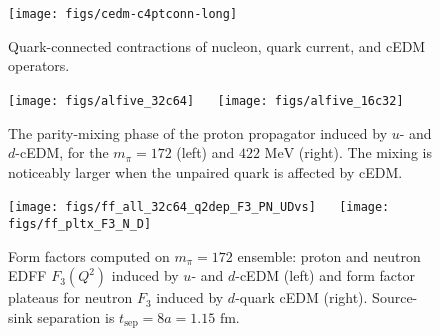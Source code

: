 \documentclass{PoS}
\begin{document}
\begin{figure}[t]
\centering
\texttt{[image: figs/cedm-c4ptconn-long]}
\caption{Quark-connected contractions of nucleon, quark current, and cEDM operators. 
  \label{fig:cedm_contract}}
\end{figure}


\begin{figure}[t]
\centering
\vspace{-.2cm}
\texttt{[image: figs/alfive\_32c64]}~
\hspace{.05\textwidth}~
\texttt{[image: figs/alfive\_16c32]}\\
\vspace{-.4cm}
\caption{The parity-mixing phase of the proton propagator induced by $u$- and $d$-cEDM, for the
  $m_\pi=172$ (left) and $422\text{ MeV}$ (right). 
  The mixing is noticeably larger when the unpaired quark is affected by cEDM.
  \label{fig:alfive}}
\end{figure}

\begin{figure}[t]
\centering
\vspace{-.2cm}
\texttt{[image: figs/ff\_all\_32c64\_q2dep\_F3\_PN\_UDvs]}~
\hspace{.05\textwidth}~
\texttt{[image: figs/ff\_pltx\_F3\_N\_D]}\\
\vspace{-.4cm}
\caption{Form factors computed on $m_\pi=172$ ensemble: proton and neutron EDFF 
  $F_3(Q^2)$ induced by $u$-  and $d$-cEDM (left)
  and form factor plateaus for neutron $F_3$ induced by $d$-quark cEDM (right).
  Source-sink separation is $t_\text{sep}=8a=1.15\text{ fm}$.
  \label{fig:ff_32c64}}
\end{figure}
\end{document}
